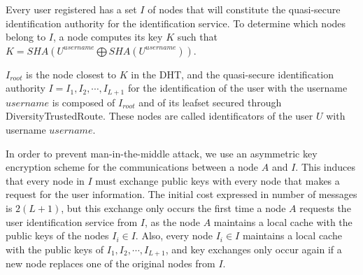Every user registered has a set $I$ of nodes that
will constitute the quasi-secure identification authority for the
identification service.
To determine which  nodes belong to $I$, a node computes its key $K$ such that
$K = SHA(U^{username} \bigoplus SHA(U^{username}))$. 

$I_{root}$ is the node closest to $K$ in the DHT, and the quasi-secure identification authority $I =
{I_1, I_2, \cdots, I_{L+1}}$ for the identification of the user with the
username $username$ is composed of $I_{root}$ and of its leafset secured
through DiversityTrustedRoute. These nodes are called identificators of the
user $U$ with username $username$.

 In order to prevent man-in-the-middle attack, we use an asymmetric key
encryption scheme for the communications between a node $A$ and $I$. This
induces that every node in $I$ must exchange public keys with every node that
makes a request for the user information. The initial cost expressed in number
of messages is $2(L+1)$, but this exchange only occurs the first time a
node $A$ requests the user identification service from $I$, as the node $A$
maintains a local cache with the public keys of the nodes $I_i \in I$. Also,
every node $I_i \in I$ maintains a local cache with the public keys of ${I_1,
I_2, \cdots, I_{L+1}}$, and key exchanges only occur again if a new node
replaces one of the original nodes from $I$.


